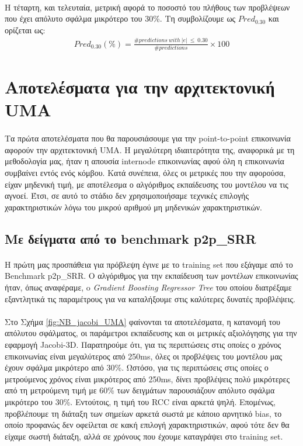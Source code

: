 \paragraph{}
Η τέταρτη, και τελευταία, μετρική αφορά το ποσοστό του πλήθους των προβλέψεων που έχει απόλυτο σφάλμα μικρότερο του 30\%. Τη συμβολίζουμε ως $Pred_{0.30}$ και ορίζεται ως:
\begin{align*}
Pred_{0.30}(\%) = \frac{\#predictions\ with\ |e|\ \leq \ 0.30}{\#predictions} \times 100
\end{align*}

\section{Αποτελέσματα για την αρχιτεκτονική UMA}
\paragraph{}
Τα πρώτα αποτελέσματα που θα παρουσιάσουμε για την point-to-point επικοινωνία αφορούν την αρχιτεκτονική UMA. Η μεγαλύτερη ιδιαιτερότητα της, αναφορικά με τη μεθοδολογία μας, ήταν η απουσία internode επικοινωνίας αφού όλη η επικοινωνία συμβαίνει εντός ενός κόμβου. Κατά συνέπεια, όλες οι μετρικές που την αφορούσα, είχαν μηδενική τιμή, με αποτέλεσμα ο αλγόριθμος εκπαίδευσης του μοντέλου  να τις αγνοεί. Έτσι, σε αυτό το στάδιο δεν χρησιμοποιήσαμε τεχνικές επιλογής χαρακτηριστικών λόγω του μικρού αριθμού μη μηδενικών χαρακτηριστικών.

\subsection{Με δείγματα από το benchmark p2p\_SRR}
\paragraph{}
Η πρώτη μας προσπάθεια για πρόβλεψη έγινε με το training set που εξάγαμε από το Benchmark p2p\_SRR. Ο αλγόριθμος για την εκπαίδευση των μοντέλων επικοινωνίας ήταν, όπως αναφέραμε, o \textit{Gradient Boosting Regressor Tree} του οποίου διατρέξαμε εξαντλητικά τις παραμέτρους για να καταλήξουμε στις καλύτερες δυνατές προβλέψεις. 
\paragraph{}
Στο Σχήμα \ref{fig:NB_jacobi_UMA} φαίνονται τα αποτελέσματα, η κατανομή του απόλυτου σφάλματος, οι παράμετροι εκπαίδευσης και οι μετρικές αξιολόγησης για την εφαρμογή Jacobi-3D. Παρατηρούμε ότι, για τις περιπτώσεις στις οποίες ο χρόνος επικοινωνίας είναι μεγαλύτερος από 250ms, όλες οι προβλέψεις του μοντέλου μας έχουν σφάλμα μικρότερο από 30\%. Ωστόσο, για τις περιπτώσεις στις οποίες ο μετρούμενος χρόνος είναι μικρότερος από 250ms, δίνει προβλέψεις πολύ μικρότερες από τη μετρούμενη τιμή με 60\% των δειγμάτων παρουσιάζουν απόλυτο σφάλμα μικρότερο του 30\%. Εντούτοις, η τιμή του RCC είναι αρκετά ψηλή. Επομένως, προβλέπουμε τη διάταξη των σημείων αρκετά σωστά με κάποιο αρνητικό bias, το οποίο προφανώς δεν οφείλεται σε κακή επιλογή χαρακτηριστικών, αφού τότε δεν θα είχαμε σωστή διάταξη, αλλά σε χρόνους που έχουμε καταγράψει στο training set.

